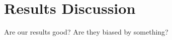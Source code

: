 %
\section{Results Discussion}
\label{sec_discussion}

Are our results good? Are they biased by something? 
